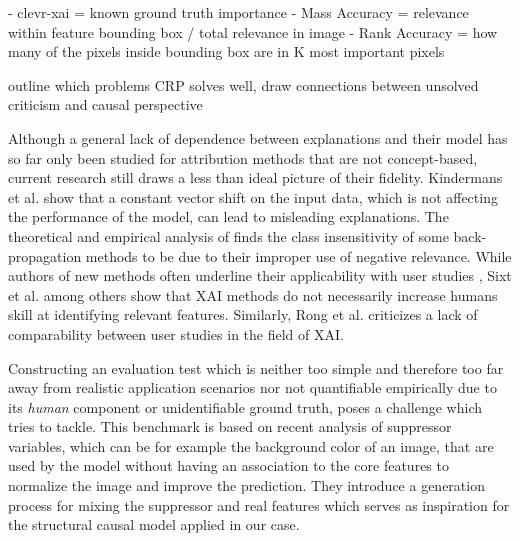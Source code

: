 \cite{Arras2022}
- clevr-xai = known ground truth importance
- Mass Accuracy = relevance within feature bounding box / total relevance in image
- Rank Accuracy = how many of the pixels inside bounding box are in K most important pixels


{\color{red} outline which problems CRP solves well, draw connections between unsolved criticism and causal perspective}

Although a general lack of dependence between explanations and their model \cite{Adebayo2018,Karimi2023} has so far only been studied for attribution methods that are not concept-based, current research still draws a less than ideal picture of their fidelity.
Kindermans et al. \cite{Kindermans2019} show that a constant vector shift on the input data, which is not affecting the performance of the model, can lead to misleading explanations. The theoretical and empirical analysis of \cite{Sixt2020} finds the class insensitivity of some back-propagation methods to be due to their improper use of negative relevance.
While authors of new methods often underline their applicability with user studies \cite{Achtibat2023,Fel2023,Ghorbani2019,Zhang2021}, Sixt et al. \cite{Sixt2022a} among others \cite{Singla2022} show that XAI methods do not necessarily increase humans skill at identifying relevant features. Similarly, Rong et al. \cite{Rong2023} criticizes a lack of comparability between user studies in the field of XAI. 

Constructing an evaluation test which is neither too simple and therefore too far away from realistic application scenarios nor not quantifiable empirically due to its \textit{human} component or unidentifiable ground truth, poses a challenge which \cite{Clark2023} tries to tackle. This benchmark is based on recent analysis \cite{Wilming2023} of suppressor variables, which can be for example the background color of an image, that are used by the model without having an association to the core features to normalize the image and improve the prediction.
They introduce a generation process for mixing the suppressor and real features which serves as inspiration for the structural causal model applied in our case.

